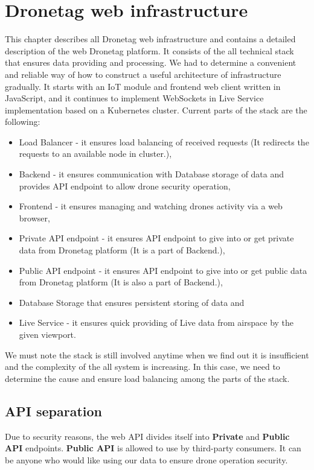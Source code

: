 \chapter{Dronetag web infrastructure}\label{ch:dronetag-web-infrastructure}
This chapter describes all Dronetag web infrastructure and contains a detailed description of the web Dronetag platform.
It consists of the all technical stack that ensures data providing and processing.
We had to determine a convenient and reliable way of how to construct a useful architecture of infrastructure gradually.
It starts with an IoT module and frontend web client written in JavaScript, and it continues to implement WebSockets in Live Service implementation based on a Kubernetes cluster.
Current parts of the stack are the following:
\begin{itemize}
    \item Load Balancer - it ensures load balancing of received requests (It redirects the requests to an available node in cluster.),
    \item Backend - it ensures communication with Database storage of data and provides API endpoint to allow drone security operation,
    \item Frontend - it ensures managing and watching drones activity via a web browser,
    \item Private API endpoint - it ensures API endpoint to give into or get private data from Dronetag platform (It is a part of Backend.),
    \item Public API endpoint - it ensures API endpoint to give into or get public data from Dronetag platform (It is also a part of Backend.),
    \item Database Storage that ensures persistent storing of data and
    \item Live Service - it ensures quick providing of Live data from airspace by the given viewport.
\end{itemize}
We must note the stack is still involved anytime when we find out it is insufficient and the complexity of the all system is increasing.
In this case, we need to determine the cause and ensure load balancing among the parts of the stack.

\section{API separation}\label{sec:api-separation}
Due to security reasons, the web API divides itself into \textbf{Private} and \textbf{Public API} endpoints.
\textbf{Public API} is allowed to use by third-party consumers.
It can be anyone who would like using our data to ensure drone operation security.

